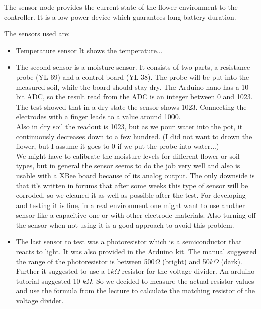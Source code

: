 
The sensor node provides the current state of the flower environment to the controller.
It is a low power device which guarantees long battery duration.

The sensors used are:
\begin{itemize}

\item Temperature sensor
It shows the temperature...

\item The second sensor is a moisture sensor. It consists of two parts, a resistance probe (YL-69) and a control board (YL-38). The probe will be put into the measured soil, while the board should stay dry. The Arduino nano has a 10 bit ADC, so the result read from the ADC is an integer between 0 and 1023.\\


The test showed that in a dry state the sensor shows 1023. Connecting the electrodes with a finger leads to a value around 1000.\\
Also in dry soil the readout is 1023, but as we pour water into the pot, it continuously decreases down to a few hundred. (I did not want to drown the flower, but I assume it goes to 0 if we put the probe into water...)\\

We might have to calibrate the moisture levels for different flower or soil types, but in general the sensor seems to do the job very well and also is usable with a XBee board because of its analog output. The only downside is that it's written in forums that after some weeks this type of sensor will be corroded, so we cleaned it as well as possible after the test. For developing and testing it is fine, in a real environment one might want to use another sensor like a capacitive one or with other electrode materials. Also turning off the sensor when not using it is a good approach to avoid this problem.\\

\item
The last sensor to test was a photoresistor which is a semiconductor that reacts to light. It was also provided in the Arduino kit. The manual suggested the range of the photoresistor is between 500$\Omega$ (bright) and 50$k\Omega$ (dark). 
Further it suggested to use a 1$k\Omega$ resistor for the voltage divider. An arduino tutorial \citep{misc:photoresistor_tutorial} suggested 10 $k\Omega$. So we decided to measure the actual resistor values and use the formula from the lecture to calculate the matching resistor of the voltage divider. %


\end{itemize}
